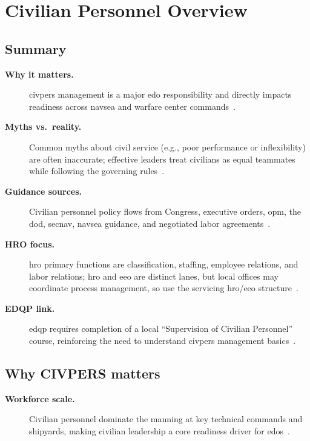 \documentclass[../main.tex]{subfiles}
\begin{document}

\section{Civilian Personnel Overview}

\subsection{Summary}
\begin{description}
  \item[\textbf{Why it matters.}] \ac{civpers} management is a major \ac{edo} responsibility and directly
  impacts readiness across \ac{navsea} and warfare center commands~\autocite{edo-6-1-1-civpers-overview-2025}.
  \item[\textbf{Myths vs.\ reality.}] Common myths about civil service (e.g., poor performance or
  inflexibility) are often inaccurate; effective leaders treat civilians as equal teammates while
  following the governing rules~\autocite{edo-6-1-1-civpers-overview-2025}.
  \item[\textbf{Guidance sources.}] Civilian personnel policy flows from Congress, executive orders,
  \ac{opm}, the \ac{dod}, \ac{secnav}, \ac{navsea} guidance, and negotiated labor agreements~\autocite{edo-6-1-1-civpers-overview-2025}.
  \item[\textbf{HRO focus.}] \ac{hro} primary functions are classification, staffing, employee relations,
  and labor relations; \ac{hro} and \ac{eeo} are distinct lanes, but local offices may coordinate process
  management, so use the servicing \ac{hro}/\ac{eeo} structure~\autocite{edo-6-1-1-civpers-overview-2025}.
  \item[\textbf{EDQP link.}] \ac{edqp} requires completion of a local ``Supervision of Civilian Personnel''
  course, reinforcing the need to understand \ac{civpers} management basics~\autocite{edo-6-1-1-civpers-overview-2025}.
\end{description}

\subsection{Why CIVPERS matters}
\begin{description}
  \item[\textbf{Workforce scale.}] Civilian personnel dominate the manning at key technical commands and
  shipyards, making civilian leadership a core readiness driver for \ac{edo}s~\autocite{edo-6-1-1-civpers-overview-2025}.
\end{description}
\end{document}
